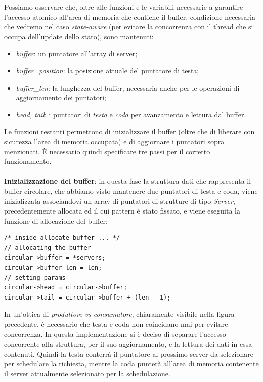 \documentclass[italian]{tktltiki2}
\begin{document}
Possiamo osservare che, oltre alle funzioni e le variabili necessarie a garantire l'accesso atomico all'area di memoria che contiene il buffer, condizione necessaria che vedremo nel caso \emph{state-aware} (per evitare la concorrenza con il thread che si occupa dell'update dello stato), sono mantenuti:
	\begin{itemize}
  		\item \emph{buffer}: un puntatore all'array di server;
  		\item \emph{buffer\_position}: la posizione attuale del puntatore di testa;
  		\item \emph{buffer\_len}: la lunghezza del buffer, necessaria anche per le operazioni di aggiornamento dei puntatori;
  		\item \emph{head, tail}: i puntatori di \emph{testa} e \emph{coda} per avanzamento e lettura dal buffer.
	\end{itemize}
	Le funzioni restanti permettono di inizializzare il buffer (oltre che di liberare con sicurezza l'area di memoria occupata) e di aggiornare i puntatori sopra menzionati. È necessario quindi specificare tre passi per il corretto funzionamento. 
\\
\\
\textbf{Inizializzazione del buffer}: in questa fase la struttura dati che rappresenta il buffer circolare, che abbiamo visto mantenere due puntatori di testa e coda, viene inizializzata associandovi un array di puntatori di strutture di tipo \emph{Server}, precedentemente allocata ed il cui pattern è stato fissato, e viene eseguita la funzione di allocazione del buffer: 
\begin{lstlisting}
/* inside allocate_buffer ... */
// allocating the buffer
circular->buffer = *servers;
circular->buffer_len = len;
// setting params
circular->head = circular->buffer;
circular->tail = circular->buffer + (len - 1);
\end{lstlisting}
In un'ottica di \emph{produttore vs consumatore}, chiaramente visibile nella figura precedente, è necessario che testa e coda non coincidano mai per evitare concorrenza. In questa implementazione si è deciso di separare l'accesso concorrente alla struttura, per il suo aggiornamento, e la lettura dei dati in essa contenuti. Quindi la testa conterrà il puntatore al prossimo server da selezionare per schedulare la richiesta, mentre la coda punterà all'area di memoria contenente il server attualmente selezionato per la schedulazione. 
\\
\\
\end{document}
